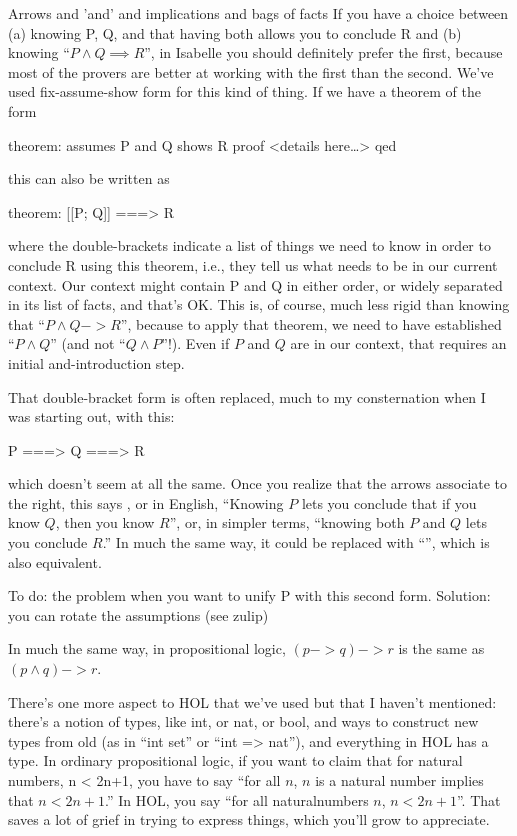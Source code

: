 Arrows and 'and' and implications and bags of facts
If you have a choice between (a) knowing P, Q, and that having both allows you to conclude R and (b) knowing ``$P  \wedge  Q \implies R$'', in Isabelle you should definitely prefer the first, because most of the provers are better at working with the first than the second. We've used fix-assume-show form for this kind of thing. If we have a theorem of the form

\begin{IS}
theorem:
   assumes P and Q   
   shows R
proof <details here\ldots > qed
\end{IS}


this can also be written as 
\begin{IS}
theorem:
   [[P; Q]] ===> R
\end{IS}

where the double-brackets indicate a list of things we need to know in order to conclude R using this theorem, i.e., they tell us what needs to be in our current context. Our context might contain P and Q in either order, or widely separated in its list of facts, and that's OK. This is, of course, much less rigid than knowing that ``$P  \wedge  Q -> R$'', because to apply that theorem, we need to have established ``$P  \wedge  Q$'' (and not ``$Q  \wedge  P$''!). Even if $P$ and $Q$ are in our context, that requires an initial and-introduction step. 

That double-bracket form is often replaced, much to my consternation when I was starting out, with this: 

\begin{IS}
    P ===> Q ===> R

\end{IS}
which doesn't seem at all the same. Once you realize that the arrows associate to the right, this says , or in English, ``Knowing $P$ lets you conclude that if you know $Q$, then you know $R$'', or, in simpler terms, ``knowing both $P$ and $Q$ lets you conclude $R$.'' In much the same way, it could be replaced with ``'', which is also equivalent. 

To do: the problem when you want to unify P with this second form. Solution: you can rotate the assumptions (see zulip)

In much the same way, in propositional logic, $(p -> q) -> r$ is the same as $(p  \wedge  q) -> r$.

There's one more aspect to HOL that we've used but that I haven't mentioned: there's a notion of types, like int, or nat, or bool, and ways to construct new types from old (as in ``int set'' or ``int => nat''), and everything in HOL has a type. In ordinary propositional logic, if you want to claim that for natural numbers, n < 2n+1, you have to say ``for all $n$,  $n$ is a natural number implies that  $n < 2n + 1$.'' In HOL, you say ``for all naturalnumbers $n$, $n < 2n + 1$''. That saves a lot of grief in trying to express things, which you'll grow to appreciate. 

